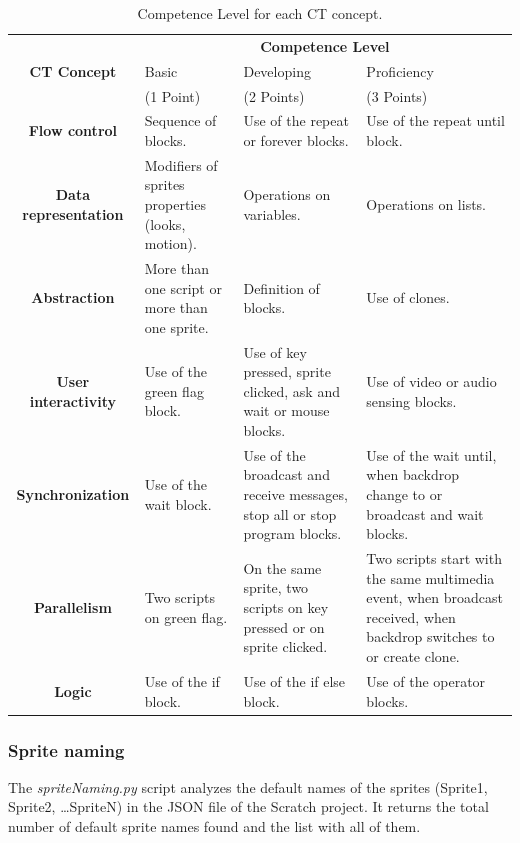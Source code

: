   \begin{table}
    \begin{center}
    \begin{tabular}{|c|p{4cm}|p{4cm}|p{4cm}|}
    \hline
     & \multicolumn{3}{|c|}{\textbf{Competence Level}} \\ \cline{2-4}
    \textbf{CT Concept} & Basic & Developing & Proficiency \\ 
    & (1 Point) & (2 Points) & (3 Points) \\ \hline  
    \textbf{Flow control} & Sequence of blocks. & Use of the repeat or forever blocks. & Use of the repeat until block. \\ \hline
    \textbf{Data representation} & Modifiers of sprites properties (looks, motion). & Operations on variables. & Operations on lists. \\ \hline
    \textbf{Abstraction} & More than one script or more than one sprite. & Definition of blocks. & Use of clones. \\ \hline
    \textbf{User interactivity} & Use of the green flag block. & Use of key pressed, sprite clicked, ask and wait or mouse blocks. & Use of video or audio sensing blocks. \\ \hline
    \textbf{Synchronization} & Use of the wait block. & Use of the broadcast and receive messages, stop all or stop program blocks. & Use of the wait until, when backdrop change to or broadcast and wait blocks. \\ \hline
    \textbf{Parallelism} & Two scripts on green flag. & On the same sprite, two scripts on key pressed or on sprite clicked. & Two scripts start with the same multimedia event, when broadcast received, when backdrop switches to or create clone. \\ \hline
    \textbf{Logic} & Use of the if block. & Use of the if else block. & Use of the operator blocks. \\ \hline
  \end{tabular}
  \caption{Competence Level for each CT concept.}
  \label{table:competence_level}
 \end{center}
\end{table}

\subsubsection{Sprite naming}
\label{subsubsec:sprite_naming}

 The \textit{spriteNaming.py} script analyzes the default names of the sprites (Sprite1, Sprite2, \ldots SpriteN) in the JSON file of the Scratch project. It returns the total number of default sprite names found and the list with all of them.

